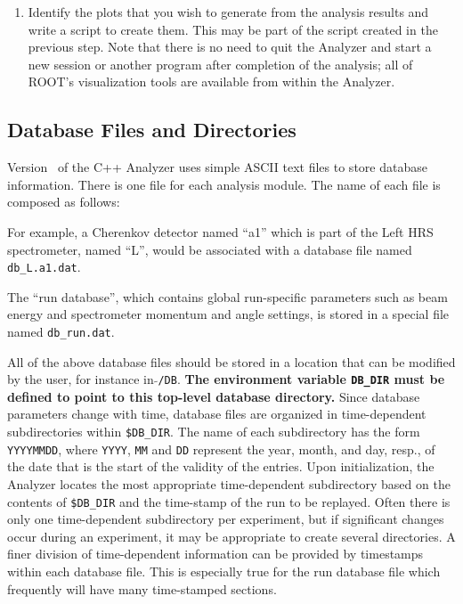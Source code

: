 {\begin{enumerate}
	in Step~\ref{offl:item:step3}. Often, a script from a
	previous experiment, or one of the examples in
	the directory {\tt \$ANALYZER/examples}, can serve as a guide.
	The script usually also locates raw data files, creates
	one or more {\tt THaRun} objects, configures various
	options of the event loop object {\tt THaAnalyzer}, and
	starts the replay. In particular, the names of the output
	file, the output definition file, and the logicals definition
	file must be given to {\tt THaAnalyzer}.
  \item Identify the plots that you wish to generate from the analysis
        results and write a script to create them. This may be part
	of the script created in the previous step. 
	Note that there is no need to quit the Analyzer and start a new
	session or another program after completion of the analysis; all of
	ROOT's visualization tools are available from within the Analyzer.
\end{enumerate}

\subsection{Database Files and Directories}
\label{offl:sec:database}
Version \cppaver\ of the C++ Analyzer uses simple ASCII text files
to store database information. There is one file for each 
analysis module. The name of each file is composed as follows:\\

\vspace{2ex}

For example, a Cherenkov detector named ``a1'' which is part of the
Left HRS spectrometer, named ``L'', would be associated with 
a database file named {\tt db\_L.a1.dat}.

The ``run database'', which contains global run-specific parameters
such as beam energy and spectrometer momentum and angle settings,
is stored in a special file named {\tt db\_run.dat}.

All of the above database files should be stored in a location
that can be modified by the user, for instance in {\tt $\tilde{}$/DB}.
{\bf The environment variable {\tt DB\_DIR}
must be defined to point to this top-level database
directory.} Since database parameters change with time, database files
are organized in time-dependent subdirectories within {\tt \$DB\_DIR}.
The name of each subdirectory has the form {\tt YYYYMMDD}, where {\tt YYYY},
{\tt MM} and {\tt DD} represent the year, month, and day, resp., of the 
date that is the start of the validity of the entries. Upon initialization,
the Analyzer locates the most appropriate time-dependent subdirectory based on
the contents of {\tt \$DB\_DIR} and the time-stamp of the run to be replayed.
Often there is only one time-dependent subdirectory per experiment, but
if significant changes occur during an experiment, it may be appropriate to
create several directories.
A finer division of time-dependent information
can be provided by timestamps within each database file. This
is especially true for the run database file which frequently
will have many time-stamped sections.

}
